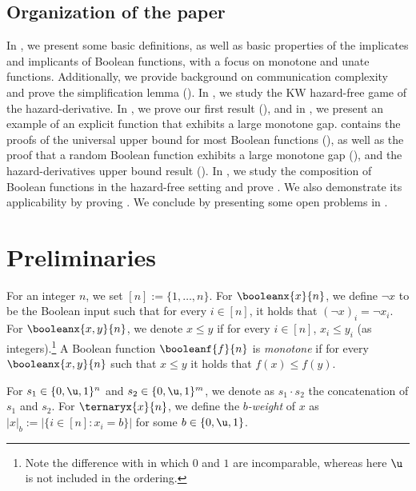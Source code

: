 \documentclass[acmsmall, nonacm, authorversion]{acmart}
\begin{document}
\subsection{Organization of the paper}
In , we present some basic definitions, as well as basic properties of the implicates and implicants of Boolean functions, with a focus on monotone and unate functions. Additionally, we provide background on communication complexity and prove the simplification lemma (). In , we study the KW hazard-free game of the hazard-derivative.
In , we prove our first result (), and in , we present an example of an explicit function that exhibits a large monotone gap.  contains the proofs of the universal upper bound for most Boolean functions (), as well as 
the proof that a random Boolean function exhibits a large monotone gap (), and the hazard-derivatives upper bound result (). In , we study the composition of Boolean functions in the hazard-free setting and prove . We also demonstrate its applicability by proving . 
We conclude by presenting some open problems in .

\section{Preliminaries}\label{section:preliminaries}
For an integer $n$, we set $[n]:=\{1,\ldots,n\}$. For $\booleanx{x}{n}$, we define $\neg x$ to be the Boolean input such that for every $i\in[n]$, it holds that $(\neg x)_i=\neg x_i$. For $\booleanx{x,y}{n}$, we denote $x \le y$ if for every $i\in[n]$, $x_i \le y_i$ (as integers).\footnote{Note the difference with  in which $0$ and $1$ are incomparable, whereas here $\u$ is not included in the ordering.} A Boolean function $\booleanf{f}{n}$ is \emph{monotone} if for every $\booleanx{x,y}{n}$ such that $x \le y$ it holds that $f(x) \le f(y)$.

For $s_1\in\{0,\u,1\}^n$ and $s_2\in\{0,\u,1\}^m$, we denote as $s_1\cdot s_2$ the concatenation of $s_1$ and $s_2$. For $\ternaryx{x}{n}$, we define the \emph{$b$-weight} of $x$ as $|x|_b:=|\{i\in[n]: x_{i}=b\}|$ for some $b\in\{0,\u,1\}$. 
\end{document}
